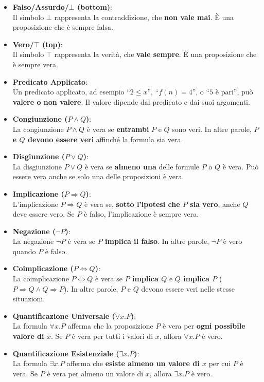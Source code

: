 \documentclass[
  a4paper,
]{article}
\begin{document}
\begin{itemize}
\item
  \textbf{Falso/Assurdo/\(\bot\) (bottom)}:\\
  Il simbolo \(\bot\) rappresenta la contraddizione, che \textbf{non
  vale mai}. È una proposizione che è sempre falsa.
\item
  \textbf{Vero/\(\top\) (top)}:\\
  Il simbolo \(\top\) rappresenta la verità, che \textbf{vale sempre}. È
  una proposizione che è sempre vera.
\item
  \textbf{Predicato Applicato}:\\
  Un predicato applicato, ad esempio ``\(2 \leqslant x\)'',
  ``\(f(n) = 4\)'', o ``\(5 \text{ è pari}\)'', può \textbf{valere o non
  valere}. Il valore dipende dal predicato e dai suoi argomenti.
\item
  \textbf{Congiunzione (\(P \land Q\))}:\\
  La congiunzione \(P \land Q\) è vera se \textbf{entrambi} \(P\) e
  \(Q\) sono veri. In altre parole, \textbf{\(P\) e \(Q\) devono essere
  veri} affinché la formula sia vera.
\item
  \textbf{Disgiunzione (\(P \lor Q\))}:\\
  La disgiunzione \(P \lor Q\) è vera se \textbf{almeno una} delle
  formule \(P\) o \(Q\) è vera. Può essere vera anche se solo una delle
  proposizioni è vera.
\item
  \textbf{Implicazione (\(P \Rightarrow Q\))}:\\
  L'implicazione \(P \Rightarrow Q\) è vera se, \textbf{sotto l'ipotesi
  che \(P\) sia vero}, anche \(Q\) deve essere vero. Se \(P\) è falso,
  l'implicazione è sempre vera.
\item
  \textbf{Negazione (\(\neg P\))}:\\
  La negazione \(\neg P\) è vera se \textbf{\(P\) implica il falso}. In
  altre parole, \(\neg P\) è vero quando \(P\) è falso.
\item
  \textbf{Coimplicazione (\(P \iff Q\))}:\\
  La coimplicazione \(P \iff Q\) è vera se \textbf{\(P\) implica \(Q\)}
  e \textbf{\(Q\) implica \(P\)}
  (\(P \Rightarrow Q \land Q \Rightarrow P\)). In altre parole, \(P\) e
  \(Q\) devono essere veri nelle stesse situazioni.
\item
  \textbf{Quantificazione Universale (\(\forall x.P\))}:\\
  La formula \(\forall x.P\) afferma che la proposizione \(P\) è vera
  per \textbf{ogni possibile valore di \(x\)}. Se \(P\) è vera per tutti
  i valori di \(x\), allora \(\forall x.P\) è vero.
\item
  \textbf{Quantificazione Esistenziale (\(\exists x.P\))}:\\
  La formula \(\exists x.P\) afferma che \textbf{esiste almeno un valore
  di \(x\)} per cui \(P\) è vera. Se \(P\) è vera per almeno un valore
  di \(x\), allora \(\exists x.P\) è vero.
\end{itemize}
\end{document}
